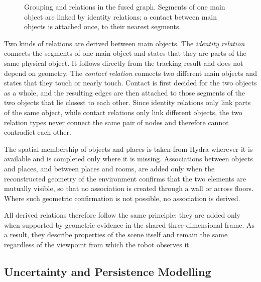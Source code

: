 {\begin{figure}[htbp]
\begin{tikzpicture}
	\end{tikzpicture}
	\caption[Grouping and relations in the fused graph]{\small Grouping and relations in the fused graph. Segments of one main object are linked by identity relations; a contact between main objects is attached once, to their nearest segments.}
	\label{fig:method_relations}
\end{figure}
 


Two kinds of relations are derived between main objects. The \textit{identity relation} connects the segments of one main object and states that they are parts of the same physical object. It follows directly from the tracking result and does not depend on geometry. The \textit{contact relation} connects two different main objects and states that they touch or nearly touch. Contact is first decided for the two objects as a whole, and the resulting edges are then attached to those segments of the two objects that lie closest to each other. Since identity relations only link parts of the same object, while contact relations only link different objects, the two relation types never connect the same pair of nodes and therefore cannot contradict each other.

The spatial membership of objects and places is taken from Hydra wherever it is available and is completed only where it is missing. Associations between objects and places, and between places and rooms, are added only when the reconstructed geometry of the environment confirms that the two elements are mutually visible, so that no association is created through a wall or across floors. Where such geometric confirmation is not possible, no association is derived.

All derived relations therefore follow the same principle: they are added only when supported by geometric evidence in the shared three-dimensional frame. As a result, they describe properties of the scene itself and remain the same regardless of the viewpoint from which the robot observes it.

}

\subsection{Uncertainty and Persistence Modelling}
\label{sec:method_uncertainty}

